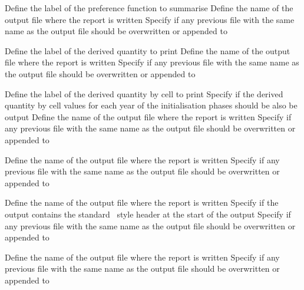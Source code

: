  {Define the label of the preference function to summarise}
 {Define the name of the output file where the report is written}
 {Specify if any previous file with the same name as the output file should be overwritten or appended to}
\par\textbf{}\par
{} {Define the label of the derived quantity to print}
 {Define the name of the output file where the report is written}
 {Specify if any previous file with the same name as the output file should be overwritten or appended to}
\par\textbf{}\par
{} {Define the label of the derived quantity by cell to print}
 {Specify if the derived quantity by cell values for each year of the initialisation phases should be also be output}
 {Define the name of the output file where the report is written}
 {Specify if any previous file with the same name as the output file should be overwritten or appended to}
\par\textbf{}\par
{} {Define the name of the output file where the report is written}
 {Specify if any previous file with the same name as the output file should be overwritten or appended to}
\par\textbf{}\par
{} {Define the name of the output file where the report is written}
 {Specify if the output contains the standard \SPM\ style header at the start of the output}
 {Specify if any previous file with the same name as the output file should be overwritten or appended to}
\par\textbf{}\par
{} {Define the name of the output file where the report is written}
 {Specify if any previous file with the same name as the output file should be overwritten or appended to}
\par\textbf{}\par
